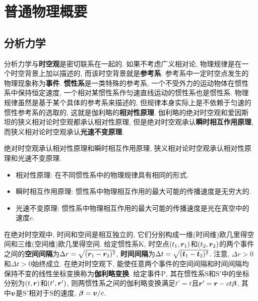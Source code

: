 \chapter[普通物理概要]{普通物理概要}
\newpage
\section[分析力学]{分析力学}\label{分析力学}
分析力学与\textbf{时空观}是密切联系在一起的. 如果不考虑广义相对论, 物理规律是在一个时空背景上加以描述的, 而该时空背景就是\textbf{参考系}. 参考系中一定时空点发生的物理现象称为\textbf{事件}. \textbf{惯性系}是一类特殊的参考系, 一个不受外力的运动物体在惯性系中保持恒定速度, 一个相对某惯性系作匀速直线运动的惯性系也是惯性系. 物理规律虽然是基于某个具体的参考系来描述的, 但规律本身实际上是不依赖于匀速的惯性参考系的选取的, 这就是伽利略的\textbf{相对性原理}. 伽利略的绝对时空观和爱因斯坦的狭义相对论时空观都承认相对性原理, 但是绝对时空观承认\textbf{瞬时相互作用原理}, 而狭义相对论时空观承认\textbf{光速不变原理}.
\begin{postulate}[时空观的基本假设]\label{pos:时空观的基本假设}
    绝对时空观承认相对性原理和瞬时相互作用原理, 狭义相对论时空观承认相对性原理和光速不变原理.
    \begin{itemize}
        \item 相对性原理: 在不同惯性系中的物理规律具有相同的形式.
        \item 瞬时相互作用原理: 惯性系中物理相互作用的最大可能的传播速度是无穷大的.
        \item 光速不变原理: 惯性系中物理相互作用的最大可能的传播速度是光在真空中的速度$ c $.
    \end{itemize}
\end{postulate}
在绝对时空观中, 时间和空间是相互独立的, 它们分别构成一维(时间维)欧几里得空间和三维(空间维)欧几里得空间. 给定惯性系$ \mathrm{K} $, 时空点$ (t_1,\vb*{r}_1) $和$ (t_2,\vb*{r}_2) $的两个事件之间的\textbf{空间间隔}为$ \Delta r = \sqrt{(\vb*{r}_1-\vb*{r}_2)^2} $, \textbf{时间间隔}为$ \Delta t = \sqrt{(\vb*{t}_1-\vb*{t}_2)^2} $. 注意, $ \Delta r > 0 $和$ \Delta t > 0 $始终成立. 在绝对时空观下, 能使任意两个事件的空间间隔和时间间隔均保持不变的线性坐标变换称为\textbf{伽利略变换}. 给定事件$ \mathrm{P} $, 其在惯性系$ \mathrm{S} $和$ \mathrm{S}' $中的坐标分别为$ (t,\vb*{r}) $和$ (t',\vb*{r}') $, 则两惯性系之间的伽利略变换满足$ t'=t $且$ \vb*{r}'=\vb*{r}-ct\vb*{\beta} $, 其中$ \vb*{v} $是$ \mathrm{S}' $相对于$ \mathrm{S} $的速度, $ \vb*{\beta}=\vb*{v}/c $.

